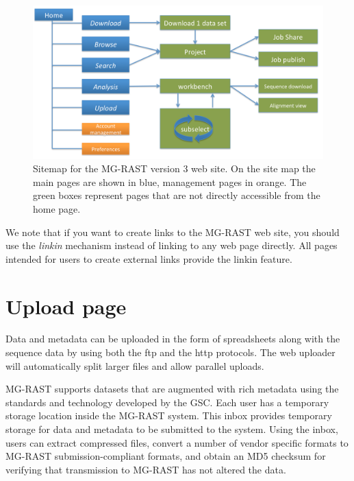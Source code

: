 \documentclass[12pt,fullpage]{report}
\begin{document}
\begin{figure}[ht]
\begin{center}
\includegraphics[width=6in]{Images/sitemap.png}
\end{center}
\caption{
Sitemap for the MG-RAST version 3 web site. On the site map the main pages are shown in blue, management pages in orange. The green boxes represent pages that are not directly accessible from the home page.
}
\label{fig:sitemap}
\end{figure}

We note that if you want to create links to the MG-RAST web site, you should use the \textit{linkin} mechanism instead of linking to any web page directly. All pages intended for users to create external links provide the linkin feature.


\section{Upload page}

Data and metadata can be uploaded in the form of spreadsheets along with the sequence data by using both the ftp and the http protocols. The web uploader will automatically split larger files and allow parallel uploads.

MG-RAST supports datasets that are augmented with rich metadata using the standards and technology developed by the GSC.
Each user has a temporary storage location inside the MG-RAST system. This inbox provides temporary storage for data and metadata to be submitted to the system. Using the inbox, users can extract compressed files, convert a number of vendor specific formats to MG-RAST submission-compliant formats, and obtain an \gls{MD5} checksum for verifying that transmission to MG-RAST has not altered the data.
\end{document}
